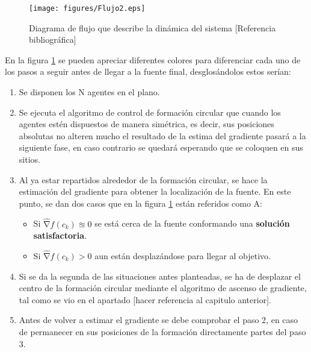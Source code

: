 \begin{figure}[htb]
\centering
\texttt{[image: figures/Flujo2.eps]}
\caption{Diagrama de flujo que describe la dinámica del sistema [Referencia bibliográfica]} \label{fig:Flujo}
\end{figure}

En la figura \ref{fig:Flujo} se pueden apreciar diferentes colores para diferenciar cada uno de los pasos a seguir antes de llegar a la fuente final, desglosándolos estos serían:

\begin{enumerate}
	\item Se disponen los N agentes en el plano.
	\item Se ejecuta el algoritmo de control de formación circular que cuando los agentes estén dispuestos de manera simétrica, es decir, sus posiciones absolutas no alteren mucho el resultado de la estima del gradiente pasará a la siguiente fase, en caso contrario se quedará esperando que se coloquen en sus sitios.
	\item Al ya estar repartidos alrededor de la formación circular, se hace la estimación del gradiente para obtener la localización de la fuente. En este punto, se dan dos casos que en la figura \ref{fig:Flujo} están referidos como A:
	\begin{itemize}
		\item Si $\widehat{\mathrm{\nabla }}{f}\left(c_{k}\right)\approxeq0$ se está cerca de la fuente conformando una \textbf{solución satisfactoria}.
		\item Si $\widehat{\mathrm{\nabla }}{f}\left(c_{k}\right)>0$ aun están desplazándose para llegar al objetivo.
	\end{itemize}
	\item Si se da la segunda de las situaciones antes planteadas, se ha de desplazar el centro de la formación circular mediante el algoritmo de ascenso de gradiente, tal como se vio en el apartado [hacer referencia al capitulo anterior].
	\item Antes de volver a estimar el gradiente se debe comprobar el paso 2, en caso de permanecer en sus posiciones de la formación directamente partes del paso 3.
\end{enumerate}



